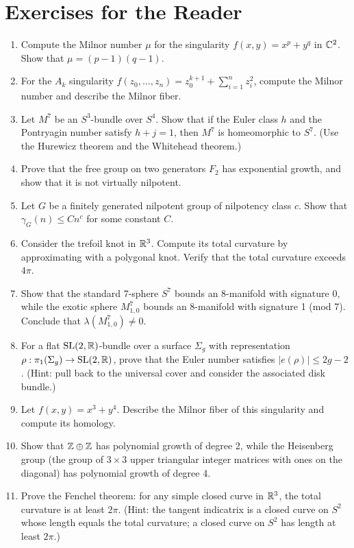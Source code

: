 \section*{Exercises for the Reader}

\begin{enumerate}
    \item [I] Compute the Milnor number \(\mu\) for the singularity \(f(x,y) = x^p + y^q\) in \(\mathbb{C}^2\). Show that \(\mu = (p-1)(q-1)\).
    \item [I] For the \(A_k\) singularity \(f(z_0,\dots,z_n) = z_0^{k+1} + \sum_{i=1}^n z_i^2\), compute the Milnor number and describe the Milnor fiber.
    \item [A] Let \(M^7\) be an \(S^3\)-bundle over \(S^4\). Show that if the Euler class \(h\) and the Pontryagin number satisfy \(h + j = 1\), then \(M^7\) is homeomorphic to \(S^7\). (Use the Hurewicz theorem and the Whitehead theorem.)
    \item [B] Prove that the free group on two generators \(F_2\) has exponential growth, and show that it is not virtually nilpotent.
    \item [I] Let \(G\) be a finitely generated nilpotent group of nilpotency class \(c\). Show that \(\gamma_G(n) \leq C n^c\) for some constant \(C\).
    \item [I] Consider the trefoil knot in \(\mathbb{R}^3\). Compute its total curvature by approximating with a polygonal knot. Verify that the total curvature exceeds \(4\pi\).
    \item [A] Show that the standard 7-sphere \(S^7\) bounds an 8-manifold with signature 0, while the exotic sphere \(M^7_{1,0}\) bounds an 8-manifold with signature 1 (mod 7). Conclude that \(\lambda(M^7_{1,0}) \neq 0\).
    \item [A] For a flat \(\operatorname{SL}(2,\mathbb{R})\)-bundle over a surface \(\Sigma_g\) with representation \(\rho: \pi_1(\Sigma_g) \to \operatorname{SL}(2,\mathbb{R})\), prove that the Euler number satisfies \(|e(\rho)| \leq 2g - 2\). (Hint: pull back to the universal cover and consider the associated disk bundle.)
    \item [I] Let \(f(x,y) = x^3 + y^4\). Describe the Milnor fiber of this singularity and compute its homology.
    \item [I] Show that \(\mathbb{Z} \oplus \mathbb{Z}\) has polynomial growth of degree 2, while the Heisenberg group (the group of \(3 \times 3\) upper triangular integer matrices with ones on the diagonal) has polynomial growth of degree 4.
    \item [I] Prove the Fenchel theorem: for any simple closed curve in \(\mathbb{R}^3\), the total curvature is at least \(2\pi\). (Hint: the tangent indicatrix is a closed curve on \(S^2\) whose length equals the total curvature; a closed curve on \(S^2\) has length at least \(2\pi\).)

\end{enumerate}

